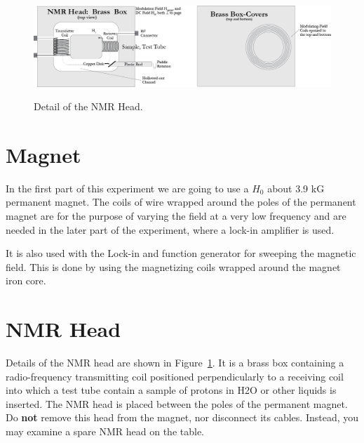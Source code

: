 \documentclass{../lab}
\begin{document}
\begin{figure}[h]
    \centering
    \href{http://experimentationlab.berkeley.edu/sites/default/files/NMR/NMR_head.png}{\includegraphics[width=0.5\linewidth]{images/NMR head.png}}
    \caption{Detail of the NMR Head.}
    \label{fig:DetailOfNMRHead}
\end{figure}



\newpage

\section{Magnet}

In the first part of this experiment we are going to use a $H_0$ about 3.9 kG permanent magnet. The coils of wire wrapped around the poles of the permanent magnet are for the purpose of varying the field at a very low frequency and are needed in the later part of the experiment, where a lock-in amplifier is used.

It is also used with the Lock-in and function generator for sweeping the magnetic field. This is done by using the magnetizing coils wrapped around the magnet iron core.

\section{NMR Head}

Details of the NMR head are shown in Figure~\ref{fig:DetailOfNMRHead}. It is a brass box containing a radio-frequency transmitting coil positioned perpendicularly to a receiving coil into which a test tube contain a sample of protons in H2O or other liquids is inserted. The NMR head is placed between the poles of the permanent magnet. Do \textbf{not} remove this head from the magnet, nor disconnect its cables. Instead, you may examine a spare NMR head on the table.
\end{document}
